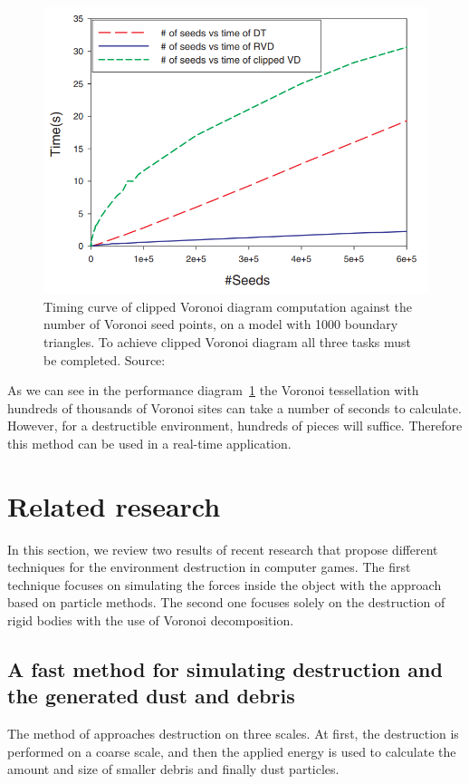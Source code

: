  \begin{figure}
    \centering
    \includegraphics[width=\textwidth]{img/clipped}
    \caption{Timing curve of clipped Voronoi diagram computation against the number of Voronoi seed points, on a model with 1000 boundary triangles.  To achieve clipped Voronoi diagram all three tasks must be completed. Source: \citet{yan2010efficient}}
    \label{fig:vorocliptime}
\end{figure}

As we can see in the performance diagram~\cref{fig:vorocliptime} the Voronoi tessellation with hundreds of thousands of Voronoi sites can take a number of seconds to calculate. However, for a destructible environment, hundreds of pieces will suffice. Therefore this method can be used in a real-time application.  

\section{Related research}
In this section, we review two results of recent research that propose different techniques for the environment destruction in computer games. The first technique focuses on simulating the forces inside the object with the approach based on particle methods. The second one focuses solely on the destruction of rigid bodies with the use of Voronoi decomposition.

\subsection{A fast method for simulating destruction and the generated dust
and debris}
\label{sec:edem}
The method of \citet{edem} approaches destruction on three scales. At first, the destruction is performed on a coarse scale, and then the applied energy is used to calculate the amount and size of smaller debris and finally dust particles.

